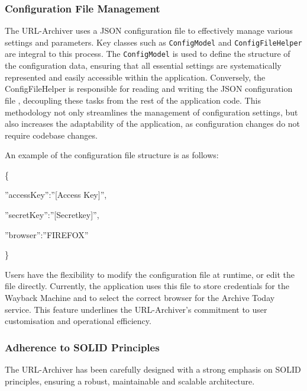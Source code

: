 \subsubsection{Configuration File Management}
The URL-Archiver uses a JSON configuration file  to effectively manage various settings and parameters. Key classes such as \texttt{ConfigModel} and \texttt{ConfigFileHelper} are integral to this process. The \texttt{ConfigModel} is used to define the structure of the configuration data, ensuring that all essential settings are systematically represented and easily accessible within the application. Conversely, the ConfigFileHelper is responsible for reading and writing the JSON configuration file , decoupling these tasks from the rest of the application code. This methodology not only streamlines the management of configuration settings, but also increases the adaptability of the application, as configuration changes do not require codebase changes.

An example of the configuration file  structure is as follows:

\{

\quad''accessKey'':''[Access Key]'',

\quad''secretKey'':''[Secretkey]'',

\quad''browser'':''FIREFOX''

\}

Users have the flexibility to modify the configuration file  at runtime, or edit the file directly. Currently, the application uses this file to store credentials for the Wayback Machine and to select the correct browser for the Archive Today service. This feature underlines the URL-Archiver's commitment to user customisation and operational efficiency.
\clearpage
\subsubsection{Adherence to SOLID Principles}
The URL-Archiver has been carefully designed with a strong emphasis on SOLID principles, ensuring a robust, maintainable and scalable architecture.

